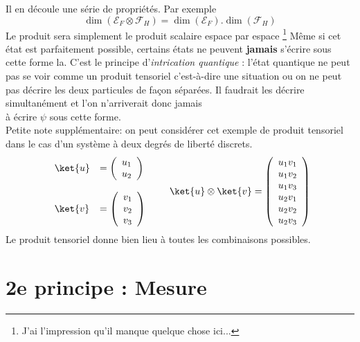  Il en découle une série de propriétés. Par exemple
 \begin{equation}
 \dim(\mathcal{E}_F\otimes\mathcal{F}_H) = \dim(\mathcal{E}_F).
 \dim(\mathcal{F}_H)
 \end{equation}
 Le produit sera simplement le produit scalaire espace par espace
 \footnote{J'ai l'impression qu'il manque quelque chose ici...}
 Même si cet état est parfaitement possible, certains états ne peuvent 
 \textbf{jamais} s'écrire sous cette forme la. C'est le principe d'\textit{intrication 
 quantique }: l'état quantique ne peut pas se voir comme un produit 
 tensoriel c'est-à-dire une situation ou on ne peut pas décrire les deux particules 
 de façon séparées. Il faudrait les décrire simultanément et l'on n'arriverait donc jamais \\
 à écrire $\psi$ sous cette forme.\\
 
 Petite note supplémentaire: on peut considérer cet exemple de produit tensoriel dans 
 le cas d'un système à deux degrés de liberté discrets.
 \begin{equation}
 \begin{array}{ll}
 \ket{u} &= \left(\begin{array}{c}
 u_1\\
 u_2
 \end{array}\right)\\
 &\\
  \ket{v} &= \left(\begin{array}{c}
 v_1\\
 v_2\\
 v_3
 \end{array}\right) 
 \end{array}\qquad \ket{u}\otimes\ket{v} = \left(\begin{array}{c}
 u_1v_1\\
 u_1v_2\\
 u_1v_3\\
 u_2v_1\\
 u_2v_2\\
 u_2v_3  
 \end{array}\right)
 \end{equation}
 Le produit tensoriel donne bien lieu à toutes les combinaisons possibles.
 
 
 \section{2e principe : Mesure}
